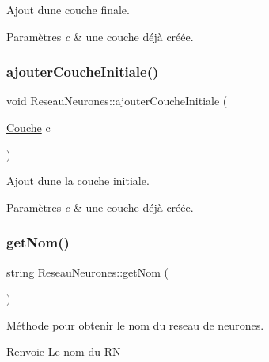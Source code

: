 Ajout d\textquotesingle{}une couche finale. 


\begin{DoxyParams}{Paramètres}
{\em c} & une couche déjà créée. \\
\hline
\end{DoxyParams}
\mbox{\label{classReseauNeurones_a21335ab1fa9c375290cb36cb06d77c79}} 
\subsubsection{\texorpdfstring{ajouter\+Couche\+Initiale()}{ajouterCoucheInitiale()}}
{\footnotesize\ttfamily void Reseau\+Neurones\+::ajouter\+Couche\+Initiale (\begin{DoxyParamCaption}\item[{\hyperlink{classCouche}{Couche}}]{c }\end{DoxyParamCaption})}



Ajout d\textquotesingle{}une la couche initiale. 


\begin{DoxyParams}{Paramètres}
{\em c} & une couche déjà créée. \\
\hline
\end{DoxyParams}
\mbox{\label{classReseauNeurones_a3dff69c97c748171ca5bacfe521e9063}} 
\subsubsection{\texorpdfstring{get\+Nom()}{getNom()}}
{\footnotesize\ttfamily string Reseau\+Neurones\+::get\+Nom (\begin{DoxyParamCaption}{ }\end{DoxyParamCaption})}



Méthode pour obtenir le nom du reseau de neurones. 

\begin{DoxyReturn}{Renvoie}
Le nom du RN 
\end{DoxyReturn}
\mbox{\label{classReseauNeurones_a7079f7694f0369187b8ff28cefcbc5eb}} 

